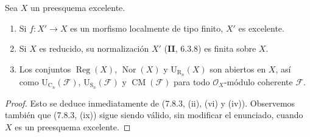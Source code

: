 \begin{proposition}[7.8.6]
Sea $X$ un preesquema excelente.
\begin{enumerate}
\item[\emph{(i)}] Si $f:X'\to X$ es un morfismo localmente de tipo finito,
$X'$ es excelente.


\item[\emph{(ii)}] Si $X$ es reducido, su normalización $X'$
\textup{(\textbf{II}, 6.3.8)} es finita sobre $X$.
\item[\emph{(iii)}] Los conjuntos $\operatorname{Reg}(X)$,
$\operatorname{Nor}(X)$ y $\mathrm U_{\mathrm R_n}(X)$ son abiertos en
$X$, así como $\mathrm U_{\mathrm C_n}(\mathcal F)$,
$\mathrm U_{\mathrm S_n}(\mathcal F)$ y $\operatorname{CM}(\mathcal F)$
para todo $\mathcal O_X$-módulo coherente $\mathcal F$.
\end{enumerate}
\end{proposition}

\begin{proof}
Esto se deduce inmediatamente de (7.8.3, (ii), (vi) y (iv)). Observemos
también que (7.8.3, (ix)) sigue siendo válido, sin modificar el enunciado,
cuando $X$ es un preesquema excelente.
\end{proof}
